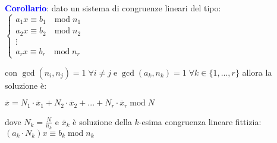 \begin{flushleft}
    \textcolor{blue}{\textbf{Corollario}}: dato un sistema di congruenze lineari del tipo: \\
    $\begin{cases} 
        a_1 x \equiv b_1 \quad \text{mod} \; n_1 \\
        a_2 x \equiv b_2 \quad \text{mod} \; n_2 \\
        \vdots \\
        a_r x \equiv b_r \quad \text{mod} \; n_r
    \end{cases}$ 

    con $\gcd (n_i, n_j) = 1 \; \forall i \neq j \; \text{e} \; \gcd (a_k, n_k) = 1 \; \forall k \in \{1, ..., r\}$ allora la soluzione è:

    {\centering
        $\overline{x} = N_1 \cdot \overline{x}_1 + N_2 \cdot \overline{x}_2 + ... + N_r \cdot \overline{x}_r \; \text{mod} \; N$
    \par}
    dove $N_k = \frac{N}{n_k}$ e $\overline{x}_k$ è soluzione della $k$-esima congruenza lineare fittizia: $(a_k \cdot N_k)x \equiv b_k \; \text{mod} \; n_k$
\end{flushleft}

